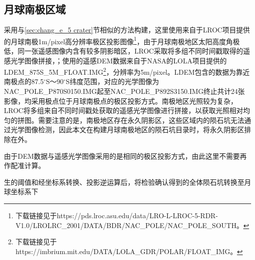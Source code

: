 
\subsection{月球南极区域}
采用与\ref{sec:chang_e_5 crater}节相似的方法构建，这里使用来自于LROC项目提供的月球南极1m/pixel高分辨率极区投影图像\footnote{ 下载链接见于https://pds.lroc.asu.edu/data/LRO-L-LROC-5-RDR-V1.0/LROLRC\_2001/DATA/BDR/NAC\_POLE/NAC\_POLE\_SOUTH。}，由于月球南极地区太阳高度角极低，同一张遥感图像内含有较多阴影暗区，LROC采取将多组不同时间戳取得的遥感光学图像拼接，；使用的遥感DEM数据来自于NASA的LOLA\cite{barkerImprovedLOLAElevation2021}项目提供的LDEM\_875S\_5M\_FLOAT.IMG\footnote{下载链接见于https://imbrium.mit.edu/DATA/LOLA\_GDR/POLAR/FLOAT\_IMG。}，分辨率为5m/pixel。LDEM包含的数据为靠近南极点的87.5$^\circ$S～90$^\circ$S纬度范围，对应的光学图像为NAC\_POLE\_P870S0150.IMG起至NAC\_POLE\_P892S3150.IMG终止共计24张影像，均采用极点位于月球南极点的极区投影方式。南极地区光照较为复杂，LROC将多组来自不同时间戳处获取的遥感光学图像进行拼接，以获取光照相对均匀的拼图。需要注意的是，南极地区存在永久阴影区，这些区域内的陨石坑无法通过光学图像检测，因此本文在构建月球南极地区的陨石坑目录时，将永久阴影区排除在外。

\par 由于DEM数据与遥感光学图像采用的是相同的极区投影方式，由此这里不需要再作配准计算。\par
生的阈值和经坐标系转换、投影逆运算后，将检验确认得到的全体陨石坑转换至月球坐标系下